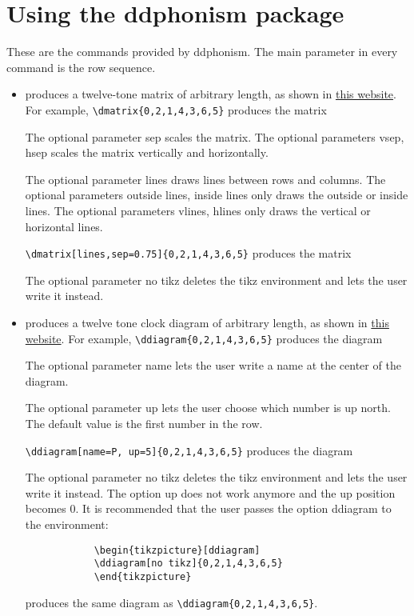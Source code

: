 \documentclass{article}
\begin{document}
	\section{Using the \textsf{ddphonism} package}
	These are the commands provided by \textsf{ddphonism}. The main parameter in every command is the row sequence.
	
	\newcommand{\I}[1]{\item[\texttt{$\backslash$#1}]\quad}
	\begin{itemize}
		\I{dmatrix} produces a twelve-tone matrix of arbitrary length, as shown in \href{https:matrices.netlify.com}{this website}. For example, \verb|| produces the matrix \dmatrix{0,2,1,4,3,6,5}

		The optional parameter \textsf{sep} scales the matrix. The optional parameters \textsf{vsep, hsep} scales the matrix vertically and horizontally.
		
		The optional parameter \textsf{lines} draws lines between rows and columns. The optional parameters \textsf{outside lines, inside lines} only draws the outside or inside lines. The optional parameters \textsf{vlines, hlines} only draws the vertical or horizontal lines.
		
		\verb|\dmatrix[lines,sep=0.75]{0,2,1,4,3,6,5}| produces the matrix\\ 
		
		The optional parameter \textsf{no tikz} deletes the tikz environment and lets the user write it instead.
		
		\I{ddiagram} produces a twelve tone clock diagram of arbitrary length, as shown in \href{https:diagramas.netlify.com}{this website}. For example, \verb|\ddiagram{0,2,1,4,3,6,5}| produces the diagram\\ 
		
		The optional parameter \textsf{name} lets the user write a name at the center of the diagram.
		
		The optional parameter \textsf{up} lets the user choose which number is up north. The default value is the first number in the row.
		
		\verb|\ddiagram[name=P, up=5]{0,2,1,4,3,6,5}| produces the diagram\\
		
		The optional parameter \textsf{no tikz} deletes the tikz environment and lets the user write it instead. The option \textsf{up} does not work anymore and the up position becomes 0. It is recommended that the user passes the option \textsf{ddiagram} to the environment:
		\begin{verbatim}
			\begin{tikzpicture}[ddiagram]
			\ddiagram[no tikz]{0,2,1,4,3,6,5}
			\end{tikzpicture}
		\end{verbatim} produces the same diagram as  \verb|\ddiagram{0,2,1,4,3,6,5}|.
		

\end{itemize}
\end{document}
